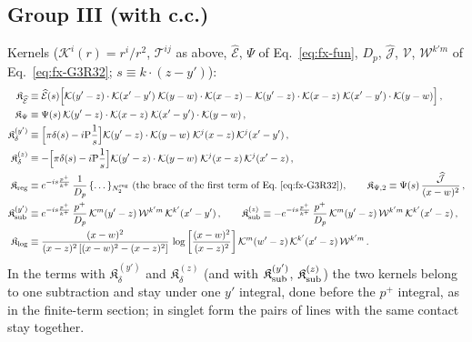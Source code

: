\documentclass[9pt]{article}
\numberwithin{equation}{section}
\begin{document}
{\subsection{Group III (with c.c.)}
\noindent Kernels ($\mathcal{K}^{i}(r)=r^{i}/r^{2}$, $\mathcal{T}^{ij}$ as above, $\widehat{\mathcal{E}}$, $\Psi$ of Eq.~\eqref{eq:fx-fun}, $D_{p}$, $\widehat{\mathcal{J}}$, $\mathcal{V}$, $\mathcal{W}^{k'm}$ of Eq.~\eqref{eq:fx-G3R32}; $s\equiv k\cdot(z-y')$):
\begin{align}
\mathfrak{K}_{\widehat{\mathcal{E}}}&\equiv\widehat{\mathcal{E}}(s)\Big[\mathcal{K}(y'-z)\cdot\mathcal{K}(x'-y')\;\mathcal{K}(y-w)\cdot\mathcal{K}(x-z)-\mathcal{K}(y'-z)\cdot\mathcal{K}(x-z)\;\mathcal{K}(x'-y')\cdot\mathcal{K}(y-w)\Big]\,,\notag\\
\mathfrak{K}_{\Psi}&\equiv\Psi(s)\,\mathcal{K}(y'-z)\cdot\mathcal{K}(x-z)\;\mathcal{K}(x'-y')\cdot\mathcal{K}(y-w)\,,\notag\\
\mathfrak{K}_{\delta}^{(y')}&\equiv\Big[\pi\delta(s)-i{\rm P}\frac{1}{s}\Big]\mathcal{K}(y'-z)\cdot\mathcal{K}(y-w)\;\mathcal{K}^{j}(x-z)\,\mathcal{K}^{j}(x'-y')\,,\notag\\
\mathfrak{K}_{\delta}^{(z)}&\equiv-\Big[\pi\delta(s)-i{\rm P}\frac{1}{s}\Big]\mathcal{K}(y'-z)\cdot\mathcal{K}(y-w)\;\mathcal{K}^{j}(x-z)\,\mathcal{K}^{j}(x'-z)\,,\notag\\
\mathfrak{K}_{\rm reg}&\equiv e^{-is\frac{p^{+}}{k^{+}}}\,\frac{1}{D_{p}}\,\{\dots\}_{N_{2}^{\rm reg}}\ \text{(the brace of the first term of Eq.~\eqref{eq:fx-G3R32})},\qquad
\mathfrak{K}_{\Psi,2}\equiv\Psi(s)\,\frac{\widehat{\mathcal{J}}}{(x-w)^{2}}\,,\notag\\
\mathfrak{K}_{\rm sub}^{(y')}&\equiv e^{-is\frac{p^{+}}{k^{+}}}\,\frac{p^{+}}{D_{p}}\,\mathcal{K}^{m}(y'-z)\,\mathcal{W}^{k'm}\,\mathcal{K}^{k'}(x'-y')\,,\qquad
\mathfrak{K}_{\rm sub}^{(z)}\equiv-e^{-is\frac{p^{+}}{k^{+}}}\,\frac{p^{+}}{D_{p}}\,\mathcal{K}^{m}(y'-z)\,\mathcal{W}^{k'm}\,\mathcal{K}^{k'}(x'-z)\,,\notag\\
\mathfrak{K}_{\log}&\equiv\frac{(x-w)^{2}}{(x-z)^{2}\left[(x-w)^{2}-(x-z)^{2}\right]}\,\log\left[\frac{(x-w)^{2}}{(x-z)^{2}}\right]\mathcal{K}^{m}(w'-z)\,\mathcal{K}^{k'}(x'-z)\,\mathcal{W}^{k'm}\,.\notag
\end{align}
In the terms with $\mathfrak{K}_{\delta}^{(y')}$ and $\mathfrak{K}_{\delta}^{(z)}$ (and with $\mathfrak{K}_{\rm sub}^{(y')}$, $\mathfrak{K}_{\rm sub}^{(z)}$) the two kernels belong to one subtraction and stay under one $y'$ integral, done before the $p^{+}$ integral, as in the finite-term section; in singlet form the pairs of lines with the same contact stay together.
}
\end{document}
